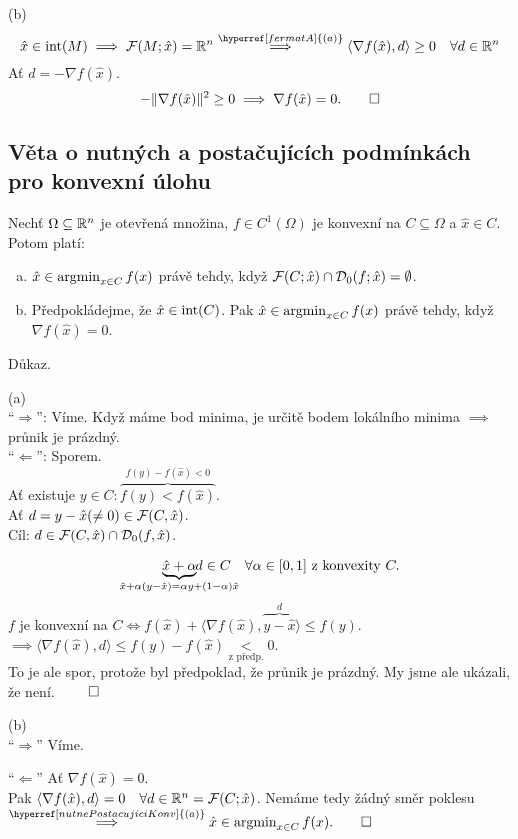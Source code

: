 (b)
\[
    \hat x \in \Int(M) \implies \F(M; \hat x) = \R^n \overset{\hyperref[fermatA]{(a)}}{\implies}
    \langle \nabla f(\hat x), d\rangle \geq 0 \quad \forall d \in \R^n
\]
Ať $d = - \nabla f (\hat x)$.
\[
    - \| \nabla f(\hat x)\|^2 \geq 0 \implies \nabla f(\hat x) = 0. \qed
\]

\subsection{Věta o nutných a postačujících podmínkách pro konvexní úlohu}\label{nutnePostacujiciKonv}
Nechť $\Omega \subseteq \mathbb{R}^n$ je otevřená množina, $f \in C^1 (\Omega)$ je konvexní na $C \subseteq \Omega$ a
$\hat x \in C$. Potom platí:
\begin{enumerate}[(a)]
    \item $\hat x \in \operatorname*{argmin}_{x \in C} f(x)$ právě tehdy, když $\mathcal{F}(C; \hat x) \cap \mathcal{D}_0(f; \hat x) = \emptyset$.
    \item Předpokládejme, že $\hat x \in \operatorname{int}(C)$. Pak $\hat x \in \operatorname*{argmin}_{x \in C}f(x)$ právě tehdy, když
    $\nabla f(\hat x) = 0$.
\end{enumerate}
Důkaz.

(a)\\
\enquote{$\Rightarrow$}: Víme. Když máme bod minima, je určitě bodem lokálního minima $\implies$ průnik je prázdný.\\
\enquote{$\Leftarrow$}: Sporem.\\
Ať existuje $y \in C : \overbrace{f(y) < f(\hat x)}^{f(y) - f(\hat x) < 0}$.\\
Ať $d = y - \hat x (\not = 0) \in \mathcal{F}(C, \hat x)$.\\
Cíl: $d \in \mathcal{F}(C, \hat x) \cap \mathcal{D}_0(f, \hat x)$.

\[
    \underbrace{\hat x + \alpha}_{\hat x + \alpha (y- \hat x) = \alpha y + (1-\alpha) \hat x} \hspace*{-11.5mm}d \in C \quad \forall
    \alpha \in [0, 1] \text{ z konvexity } C.
\]
$f$ je konvexní na $C \iff f(\hat x) + \langle \nabla f(\hat x), \overbrace{y - \hat x}^{d}\rangle \leq f(y)$.
$\implies \langle \nabla f(\hat x), d\rangle \leq f(y) - f(\hat x) \underset{\text{z předp.}}{<} 0$.\\
To je ale spor, protože byl předpoklad, že průnik je prázdný. My jsme ale ukázali, že není. $\qed$

(b)\\
\enquote{$\Rightarrow$} Víme.

\enquote{$\Leftarrow$} Ať $\nabla f(\hat x) = 0$.\\
Pak $\langle \nabla f(\hat x), d\rangle = 0 \quad \forall d \in \mathbb{R}^n = \mathcal{F} (C; \hat x)$. Nemáme tedy žádný směr poklesu
$\overset{\hyperref[nutnePostacujiciKonv]{(a)}}{\implies} \hat x \in \argmin_{x \in C} f(x). \qed$

